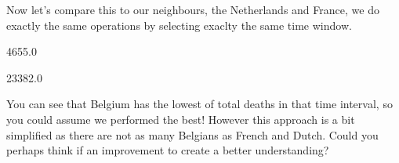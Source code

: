 \documentclass[letterpaper,10pt,english]{jupyterBook}
\begin{document}
\sphinxAtStartPar
Now let’s compare this to our neighbours, the Netherlands and France, we do exactly the same operations by selecting exaclty the same time window.

\begin{sphinxVerbatim}[commandchars=\\\{\}]
  \PYG{p}{[}\PYG{p}{]}
\PYG{p}{[}\PYG{p}{]}
\end{sphinxVerbatim}

\begin{sphinxVerbatim}[commandchars=\\\{\}]
4655.0
\end{sphinxVerbatim}

\begin{sphinxVerbatim}[commandchars=\\\{\}]
  \PYG{p}{[}\PYG{p}{]}
\PYG{p}{[}\PYG{p}{]}
\end{sphinxVerbatim}

\begin{sphinxVerbatim}[commandchars=\\\{\}]
23382.0
\end{sphinxVerbatim}

\sphinxAtStartPar
You can see that Belgium has the lowest of total deaths in that time interval, so you could assume we performed the best!
However this approach is a bit simplified as there are not as many Belgians as French and Dutch. Could you perhaps think if an improvement to create a better understanding?
\end{document}
